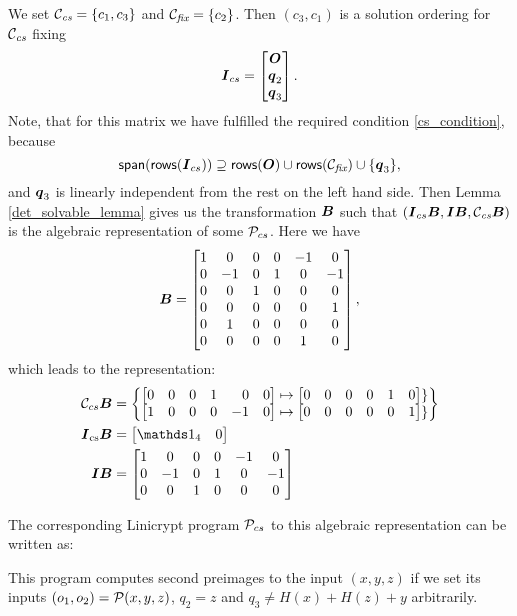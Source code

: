 We set $\Ccs = \{ c_1, c_3 \}$ and $\Cfix = \{c_2\}$.
Then $(c_3, c_1)$ is a solution ordering for $\Ccs$ fixing 
\[
\I_{cs} = \begin{bmatrix}\O \\ \vq_2 \\ \vq_3 \end{bmatrix}.
\]
Note, that for this matrix we have fulfilled the required condition \eqref{cs_condition}, because
\[
\spn(\rows(\I_{cs})) \supseteq
\rows(\O) \cup \rows(\Cfix) \cup \{ \vq_3 \},
\]
and $\vq_3$ is linearly independent from the rest on the left hand side.
Then Lemma \ref{det_solvable_lemma} gives us the transformation $\B$
such that $(\I_{cs} \B, \I \B, \Ccs \B)$
is the algebraic representation of some $\P_{cs}$.
Here we have
\[
\B = 
\begin{bmatrix}
1 & 0 & 0 & 0 &-1 & 0 \\
0 &-1 & 0 & 1 & 0 &-1 \\
0 & 0 & 1 & 0 & 0 & 0 \\
0 & 0 & 0 & 0 & 0 & 1 \\
0 & 1 & 0 & 0 & 0 & 0 \\
0 & 0 & 0 & 0 & 1 & 0
\end{bmatrix},
\]
which leads to the representation:
\begin{align*}
    \C_{cs} \B &= \begin{Bmatrix}
        \m{0 & 0 & 0 & 1 &\phantom{-}0 & 0} \mapsto \m{0 & 0 & 0 & 0 & 1 & 0} \} \\
        \m{1 & 0 & 0 & 0 &-1 & 0} \mapsto \m{0 & 0 & 0 & 0 & 0 & 1} \}
    \end{Bmatrix} \\
    \I_\textrm{cs} \B &= \m{\Id_4 & 0} \\
    \I \B &= \begin{bmatrix}
1 & 0 & 0 & 0 &-1 & 0 \\
0 &-1 & 0 & 1 & 0 &-1 \\
0 & 0 & 1 & 0 & 0 & 0
    \end{bmatrix}    
\end{align*}

The corresponding Linicrypt program $\P_{cs}$ to this algebraic representation can be written as:

This program computes second preimages to the input $(x,y,z)$
if we set its inputs $(o_1, o_2) = \P(x,y,z)$, $q_2 = z$ and $q_3 \neq H(x) + H(z) + y$ arbitrarily.


